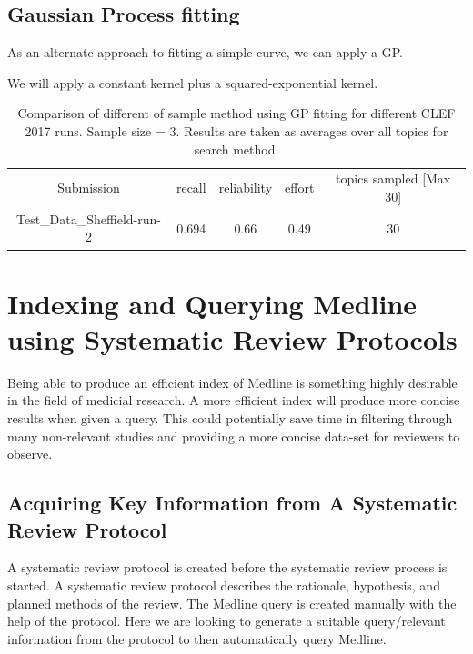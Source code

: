 \subsection{Gaussian Process fitting}

As an alternate approach to fitting a simple curve, we can apply a GP.

We will apply a constant kernel plus a squared-exponential kernel.

\begin{table}[H]
\centering
\begin{tabular}{|c|c|c|c|c|} 

 \hline
 Submission & recall & reliability & effort & topics sampled [Max 30]  \\ 
 Test\_Data\_Sheffield-run-2 & 0.694 &	0.66	&	0.49 & 30 \\ 

 \hline
\end{tabular}
\caption{Comparison of different of sample method using GP fitting for different CLEF 2017 runs. Sample size = 3. Results are taken as averages over all topics for search method.}

\end{table}

\section{Indexing and Querying Medline using Systematic Review Protocols}

Being able to produce an efficient index of Medline is something highly desirable in the field of medicial research. A more efficient index will produce more concise results when given a query. This could potentially save time in filtering through many non-relevant studies and providing a more concise data-set for reviewers to observe. 

\subsection{Acquiring Key Information from A Systematic Review Protocol}

A systematic review protocol is created before the systematic review process is started. A systematic review protocol describes the rationale, hypothesis, and planned methods of the review. The Medline query is created manually with the help of the protocol. Here we are looking to generate a suitable query/relevant information from the protocol to then automatically query Medline.

